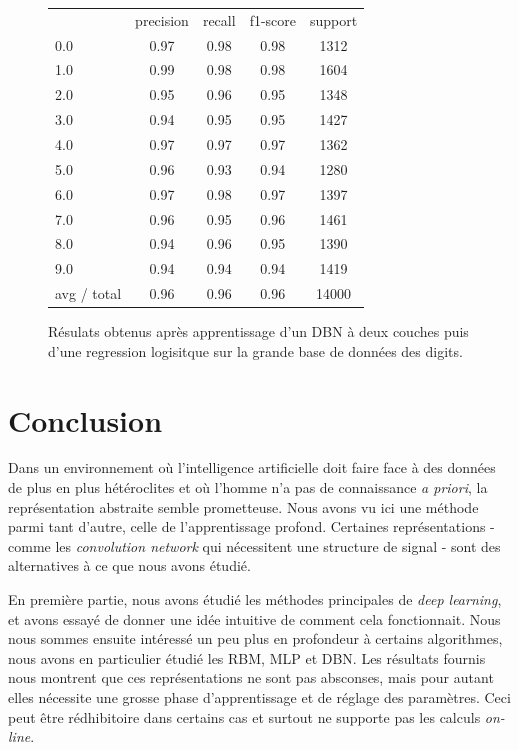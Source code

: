 \documentclass[10pt,a4paper]{article}
\begin{document}
\begin{figure}[ht!]\centering
	\begin{tabular}{l|c|c|c|c}
           &  precision&    recall&  f1-score&   support\\
        0.0&       0.97 &     0.98 &     0.98 &     1312\\
        1.0 &      0.99  &    0.98  &    0.98  &    1604\\
        2.0  &     0.95   &   0.96   &   0.95   &   1348\\
        3.0   &    0.94    &  0.95    &  0.95    &  1427\\
        4.0    &   0.97     & 0.97     & 0.97     & 1362\\
        5.0      & 0.96      &0.93      &0.94      &1280\\
        6.0     &  0.97&      0.98&      0.97&      1397\\
        7.0       &0.96 &     0.95 &     0.96 &     1461\\
        8.0&       0.94  &    0.96  &    0.95  &    1390\\
        9.0 &      0.94   &   0.94   &   0.94   &   1419\\
avg / total   &    0.96     & 0.96    &  0.96    & 14000
	\end{tabular}
	\label{DBNBigMnist}
	\caption{Résulats obtenus après apprentissage d'un DBN à deux couches puis d'une regression logisitque sur la grande base de données des digits.}
\end{figure}











\section*{Conclusion}

Dans un environnement où l'intelligence artificielle doit faire face à des données de plus en plus hétéroclites et où l'homme n'a pas de connaissance \emph{a priori}, la représentation abstraite semble prometteuse. Nous avons vu ici une méthode parmi tant d'autre, celle de l'apprentissage profond. Certaines représentations - comme les \emph{convolution network} qui nécessitent une structure de signal - sont des alternatives à ce que nous avons étudié. 

En première partie, nous avons étudié les méthodes principales de \emph{deep learning}, et avons essayé de donner une idée intuitive de comment cela fonctionnait. Nous nous sommes ensuite intéressé un peu plus en profondeur à certains algorithmes, nous avons en particulier étudié les RBM, MLP et DBN. Les résultats fournis nous montrent que ces représentations ne sont pas absconses, mais pour autant elles nécessite une grosse phase d'apprentissage et de réglage des paramètres. Ceci peut être rédhibitoire dans certains cas et surtout ne supporte pas les calculs \emph{on-line}.






\newpage



\end{document}
